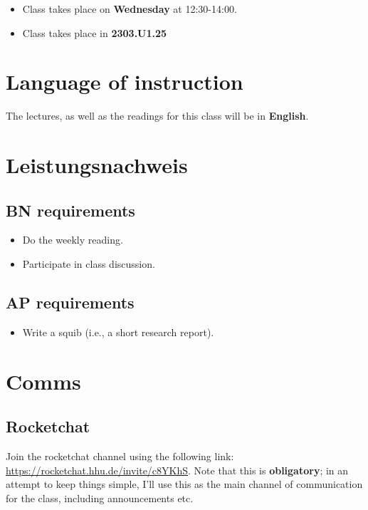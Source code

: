 \documentclass[letterpaper,parskip=half]{scrartcl}
\begin{document}
\begin{itemize}
\item Class takes place on \textbf{Wednesday} at 12:30-14:00.
\item Class takes place in \textbf{2303.U1.25}
\end{itemize}
\section{Language of instruction}
\label{sec:org07bbfab}

The lectures, as well as the readings for this class will be in \textbf{English}.
\section{Leistungsnachweis}
\label{sec:org5fa566d}

\subsection{BN requirements}
\label{sec:orgb6ad277}

\begin{itemize}
\item Do the weekly reading.
\item Participate in class discussion.
\end{itemize}
\subsection{AP requirements}
\label{sec:org1dfdbbe}

\begin{itemize}
\item Write a squib (i.e., a short research report).
\end{itemize}
\section{Comms}
\label{sec:org0f9e13a}

\subsection{Rocketchat}
\label{sec:org6724780}

Join the rocketchat channel using the following link: \url{https://rocketchat.hhu.de/invite/c8YKhS}. Note that this is \textbf{obligatory}; in an attempt to keep things simple, I'll use this as the main channel of communication for the class, including announcements etc.
\end{document}
